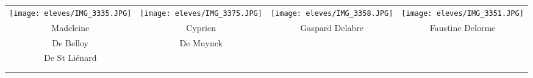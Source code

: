 \begin{center}
\begin{tabular}{cccc}
\texttt{[image: eleves/IMG\_3335.JPG]} &
\texttt{[image: eleves/IMG\_3375.JPG]} &
\texttt{[image: eleves/IMG\_3358.JPG]} &
\texttt{[image: eleves/IMG\_3351.JPG]} \\
Madeleine & Cyprien & Gaspard Delabre & Faustine Delorme \\ De Belloy & De Muynck & &\\ De St Liénard \\ \\ \\ 

\end{tabular}
\end{center}

\vfill
\pagebreak

